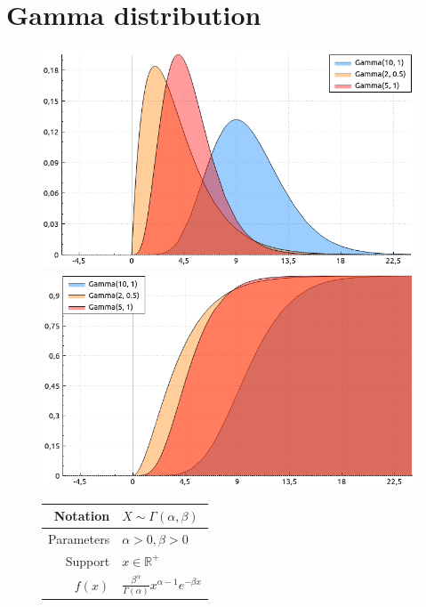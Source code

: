 \documentclass[a4paper,11pt]{article}
\theoremstyle{plain}
\theoremstyle{definition}
\newcommand{\MR}{\mathbb{R}}
\begin{document}
		
	\pagebreak
	\section{Gamma distribution}
	\begin{figure}[!htb]\centering
		\begin{minipage}{0.55\textwidth}
			\includegraphics[width=\linewidth, right]{gamma_pdf}
			\captionsetup{labelformat=empty}
			\includegraphics[width=\linewidth, right]{gamma_cdf}
			\captionsetup{labelformat=empty}
		\end{minipage}
		\begin{minipage}{0.4\textwidth}
			\begin{tabular}{| r | l |}
				\hline
				Notation & $X \sim \Gamma(\alpha, \beta)$ \\
				\hline
				Parameters & $\alpha > 0, \beta > 0$ \\
				\hline
				Support & $x \in \MR^+$  \\
				\hline
				$f(x)$ & $\frac{\beta^\alpha}{\Gamma(\alpha)} x^{\alpha-1}e^{-\beta x}  $ \\

\end{tabular}
\end{minipage}
\end{figure}
\end{document}
